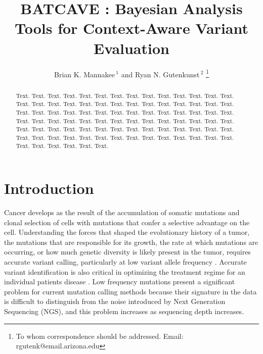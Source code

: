 \documentclass[a4,center,fleqn]{NAR}
\newcommand{\batcave}{BATCAVE }
\begin{document}
\title{\batcave: Bayesian Analysis Tools for Context-Aware Variant Evaluation}

\author{%
Brian K. Mannakee\,$^{1}$ and
Ryan N. Gutenkunst\,$^{2}$%
\footnote{To whom correspondence should be addressed.
Email: rgutenk@email.arizona.edu}}

\address{%
$^{1}$Mel and Enid Zuckerman College of Public Health, University of Arizona, Tucson AZ
and
$^{2}$Department of Molecular and Cellular Biology, University of Arizona, Tucson AZ}


\maketitle

\begin{abstract}
Text. Text. Text. Text. Text. Text. Text. Text. Text. Text. Text.
Text. Text. Text. Text. Text. Text. Text. Text. Text. Text. Text.
Text. Text. Text. Text. Text. Text. Text. Text. Text. Text. Text.
Text. Text. Text. Text. Text. Text. Text. Text. Text. Text. Text.
Text. Text. Text. Text. Text. Text. Text. Text. Text. Text. Text.
Text. Text. Text. Text. Text. Text. Text. Text. Text. Text. Text.
Text. Text. Text. Text. Text. Text. Text. Text. Text. Text. Text.
Text. Text. Text. Text. Text. Text. Text. Text. Text. Text. Text.
Text. Text.
\end{abstract}


\section{Introduction}

Cancer develops as the result of the accumulation of somatic mutations and clonal selection of cells with mutations that confer a selective advantage on the cell.
Understanding the forces that shaped the evolutionary history of a tumor, the mutations that are responsible for its growth, the rate at which mutations are occurring, or how much genetic diversity is likely present in the tumor, requires accurate variant calling, particularly at low variant allele frequency \cite{Williams2016,Bozic2016,Williams2018,Shi2018}.
Accurate variant identification is also critical in optimizing the treatment regime for an individual patients disease \citep{Ding2012,Mardis2012,Chen2013,Borad2014,Findlay2016}.
Low frequency mutations present a significant problem for current mutation calling methods because their signature in the data is difficult to distinguish from the noise introduced by Next Generation Sequencing (NGS), and this problem increases as sequencing depth increases.
\end{document}
